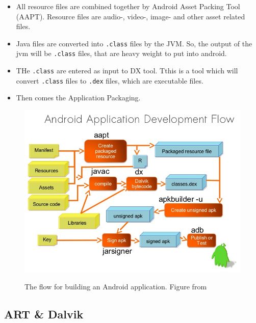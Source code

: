 \begin{itemize}
	\item All resource files are combined together by Android Asset Packing Tool (AAPT). Resource files are  audio-, video-, image-  and other asset related files. 
	\item Java files are converted into \texttt{.class} files by the JVM. So, the output of the jvm will be \texttt{.class} files, that are heavy weight to put into android. 	\item THe \texttt{.class}  are entered as input to DX tool. Tthis is a tool which will convert \texttt{.class} files to \texttt{.dex} files, which are  executable files. 
	\item Then comes the Application Packaging.
	
\end{itemize}

\begin{figure}[hb]
	\includegraphics[width=\textwidth]{images/hello/development.jpg}
	\label{fig:develop}
	\caption{The flow for building an Android application. Figure from \cite{Limbani2014}}
\end{figure}

\subsection{ART \& Dalvik}

